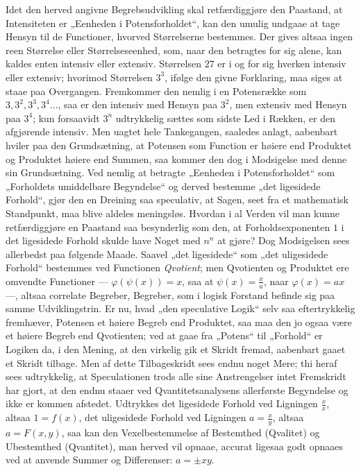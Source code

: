 \documentclass[12pt]{book}
\newcommand{\opage}[1]{\marginnote{\footnotesize\textit{[#1]}}}
\begin{document}
Idet den herved angivne Begrebsudvikling skal retfærdiggjøre den Paastand, at Intensiteten er „Eenheden i
Potensforholdet“, kan den umulig undgaae at tage Hensyn til de Functioner, hvorved Størrelserne
bestemmes. Der gives altsaa ingen reen Størrelse eller Størrelseseenhed, som, naar den betragtes for sig
alene, kan kaldes enten intensiv eller extensiv. Størrelsen $27$ er i og for sig hverken intensiv eller
extensiv; hvorimod Størrelsen $3^{3}$, ifølge den givne Forklaring, maa siges at staae paa Overgangen.
Fremkommer den nemlig i en Potensrække som $3, 3^{2}, 3^{3}, 3^{4} \ldots$, saa er den intensiv med Hensyn
paa $3^{2}$, men extensiv med Hensyn paa $3^{4}$; kun forsaavidt $3^{n}$ udtrykkelig sættes som sidste
Led i Rækken, er den afgjørende intensiv. Men uagtet hele Tankegangen, saaledes anlagt, aabenbart hviler
paa den Grundsætning, at Potensen som Function er høiere end Produktet og Produktet
\opage{308} høiere end Summen, saa kommer den dog i Modsigelse med denne sin Grundsætning. Ved nemlig at betragte
„Eenheden i Potensforholdet“ som „Forholdets umiddelbare Begyndelse“ og derved bestemme „det ligesidede
Forhold“, gjør den en Dreining saa speculativ, at Sagen, seet fra et mathematisk Standpunkt, maa blive
aldeles meningsløs. Hvordan i al Verden vil man kunne retfærdiggjøre en Paastand saa besynderlig som den,
at Forholdsexponenten $1$ i det ligesidede Forhold skulde have Noget med $n^{n}$ at gjøre? Dog
Modsigelsen sees allerbedst paa følgende Maade. Saavel „det ligesidede“ som „det uligesidede Forhold“
bestemmes ved Functionen \emph{Qvotient}; men Qvotienten og Produktet ere omvendte Functioner ---
$\varphi(\psi(x)) = x$, saa at $\psi(x) = \frac{x}{a}$, naar $\varphi(x) = ax$ ---, altsaa correlate
Begreber, Begreber, som i logisk Forstand befinde sig paa samme Udviklingstrin. Er nu, hvad „den
speculative Logik“ selv saa eftertrykkelig fremhæver, Potensen et høiere Begreb end Produktet, saa maa
den jo ogsaa være et høiere Begreb end Qvotienten; ved at gaae fra „Potens“ til „Forhold“ er Logiken da,
i den Mening, at den virkelig gik et Skridt fremad, aabenbart gaaet et Skridt tilbage. Men af dette
Tilbageskridt sees endnu noget Mere; thi heraf sees udtrykkelig, at Speculationen trods alle sine
Anstrengelser intet Fremskridt har gjort, at den endnu staaer ved Qvantitetsanalysens allerførste
Begyndelse og ikke er kommen afstedet. Udtrykkes det ligesidede Forhold ved Ligningen $\frac{x}{x}$,
altsaa $1 = f(x)$, det uligesidede Forhold ved Ligningen $a = \frac{x}{y}$, altsaa $a = F(x,y)$, saa kan
den Vexelbestemmelse af Bestemthed (Qvalitet) og Ubestemthed (Qvantitet), man herved vil opnaae, accurat
ligesaa godt opnaaes ved at anvende Summer og Differenser: $a = \pm x y$.
\end{document}

